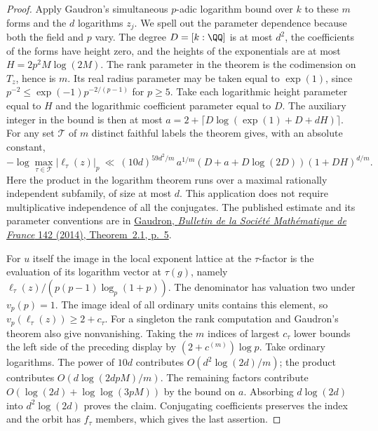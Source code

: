 \documentclass[a4paper,11pt]{article}
\theoremstyle{definition}
\theoremstyle{remark}
\numberwithin{equation}{section}
\begin{document}
\begin{proof}
Apply Gaudron's simultaneous \(p\)-adic logarithm bound over
\(k\) to these \(m\) forms and the \(d\) logarithms \(z_j\).
We spell out the parameter dependence because both the field
and \(p\) vary. The degree \(D=[k:\QQ]\) is at most \(d^2\),
the coefficients of the forms have height zero, and the
heights of the exponentials are at most
\(H=2p^2M\log(2M)\). The rank parameter in the theorem is
the codimension on \(T_z\), hence is \(m\). Its real
radius parameter may be taken equal to \(\exp(1)\), since
\(p^{-2}\le \exp(-1)p^{-2/(p-1)}\) for \(p\ge5\).
Take each logarithmic height parameter equal to \(H\) and
the logarithmic coefficient parameter equal to \(D\).
The auxiliary integer in the bound is then at most
\(a=2+\lceil D\log(\exp(1)+D+dH)\rceil\).
For any set \(\mathcal T\) of \(m\) distinct faithful labels
the theorem gives, with an absolute constant,
\[
 -\log\max_{\tau\in\mathcal T}|\ell_\tau(z)|_p
 \ \ll\ (10d)^{59d^2/m}\,a^{1/m}
       (D+a+D\log(2D))(1+DH)^{d/m}.
\]
Here the product in the logarithm theorem runs over a
maximal rationally independent subfamily, of size at most
\(d\). This application does not require multiplicative
independence of all the conjugates. The published estimate
and its parameter conventions are in
\href{https://smf.emath.fr/system/files/2017-08/smf_bull_142_1-62.pdf}{%
Gaudron, \emph{Bulletin de la Soci\'et\'e Math\'ematique de France}
142 (2014), Theorem~2.1, p.~5}.

For \(u\) itself the image in the local exponent lattice at
the \(\tau\)-factor is the evaluation of its logarithm vector
at \(\tau(g)\), namely
\(\ell_\tau(z)/(p(p-1)\log_p(1+p))\).
The denominator has valuation two under \(v_p(p)=1\).
The image ideal of all ordinary units contains this element,
so \(v_p(\ell_\tau(z))\ge2+c_\tau\). For a singleton the
rank computation and Gaudron's theorem also give nonvanishing.
Taking the \(m\) indices of largest \(c_\tau\) lower bounds the
left side of the preceding display by \((2+c^{(m)})\log p\).
Take ordinary logarithms. The power of \(10d\) contributes
\(O(d^2\log(2d)/m)\); the product contributes
\(O(d\log(2dpM)/m)\). The remaining factors contribute
\(O(\log(2d)+\log\log(3pM))\) by the bound on \(a\).
Absorbing \(d\log(2d)\) into \(d^2\log(2d)\) proves the
claim. Conjugating coefficients preserves the index and the
orbit has \(f_\tau\) members, which gives the last assertion.
\end{proof}
\end{document}
